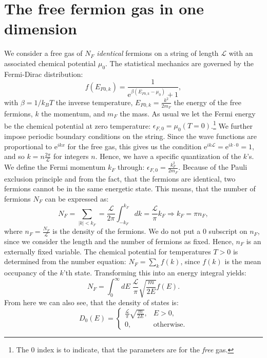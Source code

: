 \section{The free fermion gas in one dimension} \label{sec.chemicalpotential.freegas}
We consider a free gas of $N_F$ \textit{identical} fermions on a string of length $\mathcal{L}$ with an associated chemical potential $\mu_0$. The statistical mechanics are governed by the Fermi-Dirac distribution:
\begin{equation}
f(E_{F0,k}) = \frac{1}{\text{e}^{\beta(E_{F0,k}-\mu_0)} + 1},
\end{equation}
with $\beta = 1/k_BT$ the inverse temperature, $E_{F0,k} = \frac{k^2}{2m_F}$ the energy of the free fermions, $k$ the momentum, and $m_F$ the mass. As usual we let the Fermi energy be the chemical potential at zero temperature: $\epsilon_{F,0} = \mu_0(T=0)$.\footnote{The 0 index is to indicate, that the parameters are for the \textit{free} gas.} We further impose periodic boundary conditions on the string. Since the wave functions are proportional to $\text{e}^{ikx}$ for the free gas, this gives us the condition $\text{e}^{ik\mathcal{L}} = \text{e}^{ik\cdot 0} = 1$, and so $k = n\frac{2\pi}{\mathcal{L}}$ for integers $n$. Hence, we have a specific quantization of the $k$'s. We define the Fermi momentum $k_F$ through: $\epsilon_{F,0} = \frac{k_F^2}{2m_F}$. Because of the Pauli exclusion principle and from the fact, that the fermions are identical, two fermions cannot be in the same energetic state. This means, that the number of fermions $N_F$ can be expressed as:
\begin{equation}
N_F = \sum_{|k|< k_F} = \frac{\mathcal{L}}{2\pi} \int_{-k_F}^{k_F} dk = \frac{\mathcal{L}}{\pi} k_F \Rightarrow k_F = \pi n_F, 
\label{eq.relationkfnf}
\end{equation}
where $n_F = \frac{N_F}{\mathcal{L}}$ is the density of the fermions. We do not put a 0 subscript on $n_F$, since we consider the length and the number of fermions as fixed. Hence, $n_F$ is an externally fixed variable. The chemical potential for temperatures $T>0$ is determined from the number equation: $N_F = \sum_k f(k)$, since $f(k)$ is the mean occupancy of the $k$'th state. Transforming this into an energy integral yields:
\begin{equation}
N_F = \int_0^\infty dE \; \frac{\mathcal{L}}{\pi}\sqrt{\frac{m}{2E}} f(E). 
\label{eq.numberequationfreegas}
\end{equation}
From here we can also see, that the density of states is:
\begin{equation}
D_0(E) = \left\{\begin{matrix}
 \frac{\mathcal{L}}{\pi}\sqrt{\frac{m}{2E}}, & E > 0,  \\ 
 0, & \text{otherwise}. 
\end{matrix}\right. 
\label{eq.densityofstatesfreegas}
\end{equation}
